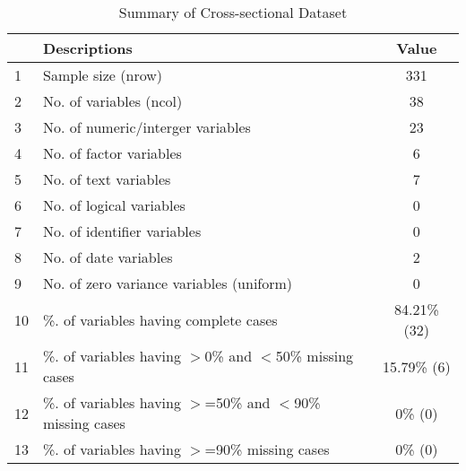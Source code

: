 \begin{table}[ht]
\centering
\caption{Summary of Cross-sectional Dataset} 
\begin{tabular}{llc}
  \hline
 & Descriptions & Value \\ 
  \hline
1 & Sample size (nrow) & 331 \\ 
  2 & No. of variables (ncol) & 38 \\ 
  3 & No. of numeric/interger variables & 23 \\ 
  4 & No. of factor variables & 6 \\ 
  5 & No. of text variables & 7 \\ 
  6 & No. of logical variables & 0 \\ 
  7 & No. of identifier variables & 0 \\ 
  8 & No. of date variables & 2 \\ 
  9 & No. of zero variance variables (uniform) & 0 \\ 
  10 & \%. of variables having complete cases & 84.21\% (32) \\ 
  11 & \%. of variables having $>$0\% and $<$50\% missing cases & 15.79\% (6) \\ 
  12 & \%. of variables having $>$=50\% and $<$90\% missing cases & 0\% (0) \\ 
  13 & \%. of variables having $>$=90\% missing cases & 0\% (0) \\ 
   \hline
\end{tabular}
\end{table}

